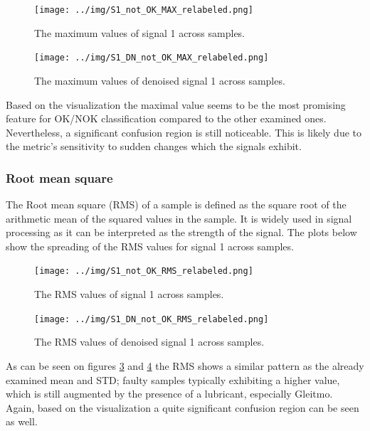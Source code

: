 \documentclass[12pt]{report}
\begin{document}
\begin{figure}[H]
	\centering
	\texttt{[image: ../img/S1\_not\_OK\_MAX\_relabeled.png]}
	\caption{The maximum values of signal 1 across samples.}
	\label{fig:S1MAX}
\end{figure}
\begin{figure}[H]
	\centering
	\texttt{[image: ../img/S1\_DN\_not\_OK\_MAX\_relabeled.png]}
	\caption{The maximum values of denoised signal 1 across samples.}
	\label{fig:S1DNMAX}
\end{figure}
Based on the visualization the maximal value seems to be the most promising feature for OK/NOK classification compared to the other examined ones. Nevertheless, a significant confusion region is still noticeable. This is likely due to the metric’s sensitivity to sudden changes which the signals exhibit.

\subsubsection{Root mean square}
The Root mean square (RMS) of a sample is defined as the square root of the arithmetic mean of the squared values in the sample. It is widely used in signal processing as it can be interpreted as the strength of the signal. The plots below show the spreading of the RMS values for signal 1 across samples.
\begin{figure}[H]
	\centering
	\texttt{[image: ../img/S1\_not\_OK\_RMS\_relabeled.png]}
	\caption{The RMS values of signal 1 across samples.}
	\label{fig:S1RMS}
\end{figure}
\begin{figure}[H]
	\centering
	\texttt{[image: ../img/S1\_DN\_not\_OK\_RMS\_relabeled.png]}
	\caption{The RMS values of denoised signal 1 across samples.}
	\label{fig:S1DNRMS}
\end{figure}
As can be seen on figures \ref{fig:S1RMS} and \ref{fig:S1DNRMS} the RMS shows a similar pattern as the already examined mean and STD; faulty samples typically exhibiting a higher value, which is still augmented by the presence of a lubricant, especially Gleitmo. Again, based on the visualization a quite significant confusion region can be seen as well.
\end{document}
